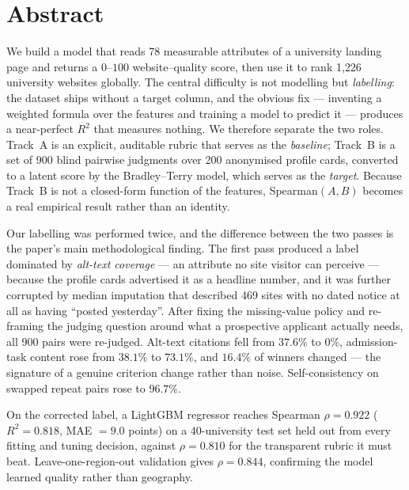 \documentclass[11pt,a4paper]{article}
\begin{document}
\section*{Abstract}

We build a model that reads 78 measurable attributes of a university landing page and returns
a $0$--$100$ website--quality score, then use it to rank 1{,}226 university websites globally.
The central difficulty is not modelling but \emph{labelling}: the dataset ships without a
target column, and the obvious fix --- inventing a weighted formula over the features and
training a model to predict it --- produces a near-perfect $R^2$ that measures nothing. We
therefore separate the two roles. Track~A is an explicit, auditable rubric that serves as the
\emph{baseline}; Track~B is a set of 900 blind pairwise judgments over 200 anonymised profile
cards, converted to a latent score by the Bradley--Terry model, which serves as the
\emph{target}. Because Track~B is not a closed-form function of the features, Spearman$(A,B)$
becomes a real empirical result rather than an identity.

Our labelling was performed twice, and the difference between the two passes is the paper's
main methodological finding. The first pass produced a label dominated by \emph{alt-text
coverage} --- an attribute no site visitor can perceive --- because the profile cards
advertised it as a headline number, and it was further corrupted by median imputation that
described 469 sites with no dated notice at all as having ``posted yesterday''. After fixing
the missing-value policy and re-framing the judging question around what a prospective
applicant actually needs, all 900 pairs were re-judged. Alt-text citations fell from
$37.6\%$ to $0\%$, admission-task content rose from $38.1\%$ to $73.1\%$, and $16.4\%$ of
winners changed --- the signature of a genuine criterion change rather than noise.
Self-consistency on swapped repeat pairs rose to $96.7\%$.

On the corrected label, a LightGBM regressor reaches Spearman $\rho = 0.922$ ($R^2 = 0.818$,
MAE $= 9.0$ points) on a 40-university test set held out from every fitting and tuning
decision, against $\rho = 0.810$ for the transparent rubric it must beat. Leave-one-region-out
validation gives $\rho = 0.844$, confirming the model learned quality rather than geography.

\end{document}

